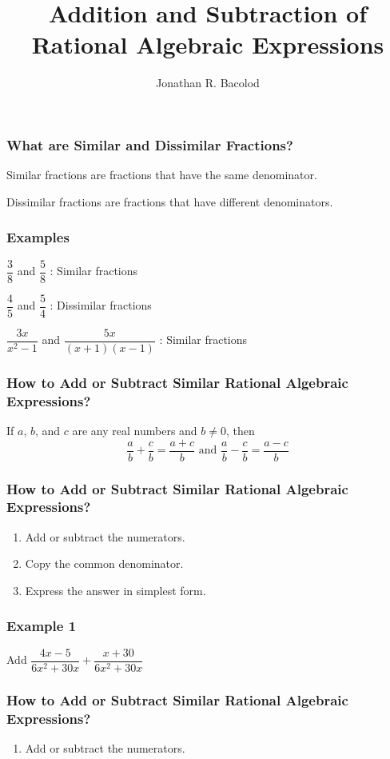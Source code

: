 \documentclass[14pt]{beamer}
\title[] {Addition and Subtraction of Rational Algebraic Expressions}
\author{Jonathan R. Bacolod}
\institute[SHS]{Sauyo High School}
\date{}
\begin{document}
	\frame{\titlepage}
	
	\begin{frame}
		\frametitle{What are Similar and Dissimilar Fractions?}
		Similar fractions are fractions that have the same denominator.
		
		Dissimilar fractions are fractions that have different denominators.
	\end{frame}

    \begin{frame}
    	\frametitle{Examples}
    	$ \dfrac{3}{8} $ and $ \dfrac{5}{8} $ : \pause Similar fractions 
    	
    	\pause \vspace{1em} $ \dfrac{4}{5} $ and $ \dfrac{5}{4} $ : \pause Dissimilar fractions 
    	
    	\pause \vspace{1em} $ \dfrac{3x}{x^2 - 1} $ and $ \dfrac{5x}{(x + 1)(x - 1)} $ : \pause Similar fractions 
    \end{frame}

    \begin{frame}
    	\frametitle{How to Add or Subtract Similar Rational Algebraic Expressions?}
    	If $ a $, $ b $, and $ c $ are any real numbers and $ b \neq 0 $, then \[ \dfrac{a}{b} + \dfrac{c}{b} = \dfrac{a + c}{b} \text{ and } \dfrac{a}{b} - \dfrac{c}{b} = \dfrac{a - c}{b} \]
    \end{frame}

    \begin{frame}
    	\frametitle{How to Add or Subtract Similar Rational Algebraic Expressions?}
    	\begin{enumerate}
    		\item<1-> Add or subtract the numerators.
    		\item<2-> Copy the common denominator.
    		\item<3-> Express the answer in simplest form.
    	\end{enumerate}
    \end{frame}

    \begin{frame}
    	\frametitle{Example 1}
    	Add $ \dfrac{4x - 5}{6x^2 + 30x} + \dfrac{x + 30}{6x^2 + 30x} $ 
    \end{frame}

    \begin{frame}
    	\frametitle{How to Add or Subtract Similar Rational Algebraic Expressions?}
    	\begin{enumerate}
    		\item Add or subtract the numerators.
    	\end{enumerate}
    \end{frame}
\end{document}
